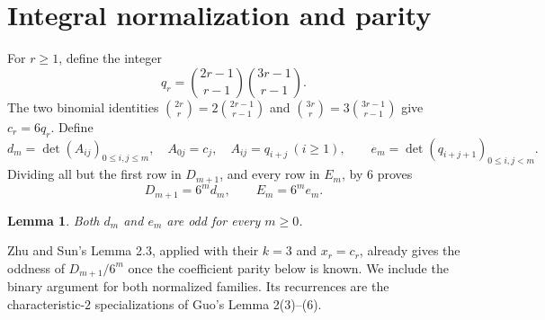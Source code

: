 \documentclass[11pt]{article}
\newtheorem{lemma}[theorem]{Lemma}
\begin{document}
\section{Integral normalization and parity}
For $r\geq1$, define the integer
\[
 q_r=\binom{2r-1}{r-1}\binom{3r-1}{r-1}.
\]
The two binomial identities
$\binom{2r}r=2\binom{2r-1}{r-1}$ and
$\binom{3r}r=3\binom{3r-1}{r-1}$ give $c_r=6q_r$.
Define
\[
 d_m=\det(A_{ij})_{0\leq i,j\leq m},\quad
 A_{0j}=c_j,\quad A_{ij}=q_{i+j}\ (i\geq1),\qquad
 e_m=\det(q_{i+j+1})_{0\leq i,j<m}.
\]
Dividing all but the first row in $D_{m+1}$, and every row in $E_m$, by
$6$ proves
\begin{equation}\label{eq:normalize}
 D_{m+1}=6^m d_m,\qquad E_m=6^m e_m.
\end{equation}

\begin{lemma}\label{lem:parity}
Both $d_m$ and $e_m$ are odd for every $m\geq0$.
\end{lemma}
Zhu and Sun's Lemma 2.3\cite{zhusun}, applied with their $k=3$ and
$x_r=c_r$, already gives the oddness of $D_{m+1}/6^m$ once the
coefficient parity below is known. We include the binary argument for
both normalized families. Its recurrences are the characteristic-$2$
specializations of Guo's Lemma 2(3)--(6)\cite{guo}.
\end{document}
